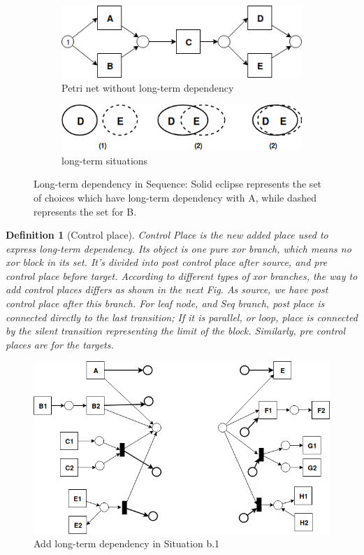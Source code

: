 \documentclass[]{article}
\newtheorem{mydef}{Definition}[section]
\begin{document}
\begin{figure}[h!]
	\centering
	\begin{subfigure}[b]{\textwidth}
		\centering
		\includegraphics[width=\linewidth]{LT_Seq_01_Original.png}
		\caption{Petri net without long-term dependency}
		\label{fig:pn_without_lt_exm01}
	\end{subfigure}
	\hfill
	\hfill
	\begin{subfigure}[b]{\textwidth}
		\centering
		\includegraphics[width=\linewidth]{LT_Seq_01_SetCases.png}
		\caption{long-term situations}
		\label{fig:model_b}
	\end{subfigure}
	\caption{Long-term dependency in Sequence: \small{Solid eclipse represents the set of choices which have long-term dependency with A, while dashed represents the set for B.}}
	\label{fig:lt_seq_examples}
\end{figure}
\begin{mydef}[Control place]
Control Place is the new added place used to express long-term dependency. Its object is one pure xor branch, which means no xor block in its set. It's divided into post control place after source, and pre control place before target. 
According to different types of xor branches, the way to add control places differs as shown in the next Fig. As source, we have post control place after this branch. For leaf node, and Seq branch, post place is connected directly to the last transition; If it is parallel, or loop, place is connected by the silent transition representing the limit of the block. Similarly, pre control places are for the targets.
\end{mydef}
\begin{figure}[!h]
	\includegraphics[width=\textwidth]{LT_ControlPlace_01.png}
	\caption{Add long-term dependency in Situation b.1}
	\label{fig:lt_control_place}
\end{figure}
\end{document}
